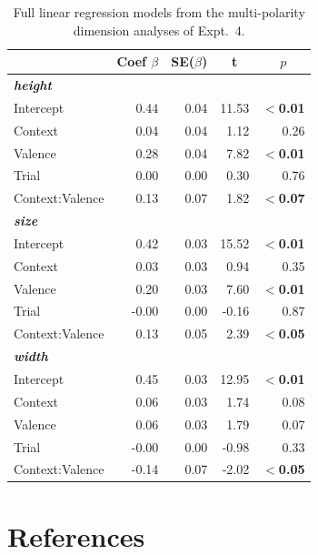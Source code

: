 \documentclass[preprint,12pt,authoryear,titlepage]{elsarticle}
\begin{document}
\begin{table}[htb] 
	\renewcommand\thetable{D.1}
	\centering \caption{Full linear regression models from the multi-polarity dimension analyses of Expt.~4.} \label{expt4analysisb}
	\begin{tabular}{lrrrr}\toprule
		&	Coef $\beta$	&	SE($\beta$)	&	\multicolumn{1}{c}{ \textbf{t}}	&	\multicolumn{1}{c}{$p$}\\ \midrule
		\emph{\textbf{height}}\\
		Intercept 		& 	0.44 	&	0.04	&	11.53	&	\textbf{$<$0.01} \\
		Context			&	0.04	&   0.04	&	1.12	&	0.26 \\
		Valence			&	0.28	&   0.04	&	7.82	&	\textbf{$<$0.01} \\
		Trial			&	0.00	&   0.00	&	0.30	&	0.76 \\
		Context:Valence	&	0.13	&   0.07	&	1.82	&	\textbf{$<$0.07} \\ \hline
		\emph{\textbf{size}}\\
		Intercept 		& 	0.42 	&	0.03	&	15.52	&	\textbf{$<$0.01} \\
		Context			&	0.03	&   0.03	&	0.94	&	0.35 \\
		Valence			&	0.20	&   0.03	&	7.60	&	\textbf{$<$0.01} \\
		Trial			&	-0.00	&   0.00	&	-0.16	&	0.87 \\
		Context:Valence	&	0.13	&   0.05	&	2.39	&	\textbf{$<$0.05} \\ \hline
		\emph{\textbf{width}}\\
		Intercept 		& 	0.45 	&	0.03	&	12.95	&	\textbf{$<$0.01} \\
		Context			&	0.06	&   0.03	&	1.74	&	0.08 \\
		Valence			&	0.06	&   0.03	&	1.79	&	0.07 \\
		Trial			&	-0.00	&   0.00	&	-0.98	&	0.33 \\
		Context:Valence	&	-0.14	&   0.07	&	-2.02	&	\textbf{$<$0.05} \\ \bottomrule
	\end{tabular}
\end{table}


\section*{References}

   
  


%
%
%
\end{document}
